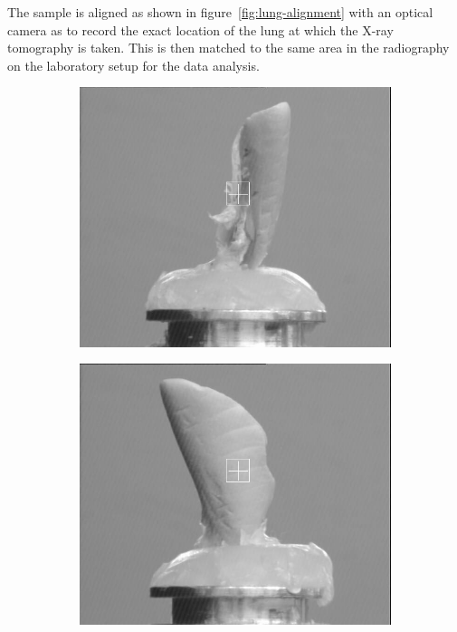 The sample is aligned as shown in figure~\ref{fig:lung-alignment} with an
optical camera as to record the exact location of the lung at which the X-ray
tomography is taken. This is then matched to the same area in the
radiography on the laboratory setup for the data analysis.

\begin{figure}[htb]
    \centering
    \begin{subfigure}[b]{.49\textwidth}
    \centering
    \includegraphics[width=\textwidth]{gfx/lung-paper-figures/KO202_LL_control_1_00degree.png}
    \caption{}
    \label{fig:reconstructed}
    \end{subfigure}
    \hfill
    \begin{subfigure}[b]{.49\textwidth}
    \centering
    \includegraphics[width=\textwidth]{gfx/lung-paper-figures/KO202_LL_control_1_90degree.png}

\end{subfigure}
\end{figure}
